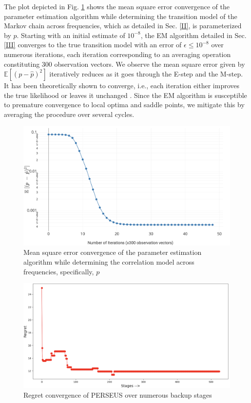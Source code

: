 \documentclass[10pt,twocolumn]{IEEEtran}
\begin{document}
The plot depicted in Fig. \ref{fig:4} shows the mean square error convergence of the parameter estimation algorithm while determining the transition model of the Markov chain across frequencies, which as detailed in Sec. \ref{II}, is parameterized by $p$. Starting with an initial estimate of $10^{-8}$, the EM algorithm detailed in Sec. \ref{III} converges to the true transition model with an error of $\epsilon{\leq}10^{-8}$ over numerous iterations, each iteration corresponding to an averaging operation constituting 300 observation vectors. We observe the mean square error given by $\mathbb{E}[(p{-}\hat{p})^{2}]$ iteratively reduces as it goes through the E-step and the M-step. It has been theoretically shown to converge, i.e., each iteration either improves the true likelihood or leaves it unchanged \cite{Neal1998}. Since the EM algorithm is susceptible to premature convergence to local optima and saddle points, we mitigate this by averaging the procedure over several cycles.
\begin{figure}
    \centering
    \includegraphics[width=1.0\linewidth]{ParameterEstimatorConvergence.png}
    \caption{Mean square error convergence of the parameter estimation algorithm while determining the correlation model across frequencies, specifically, $p$}
    \label{fig:4}
\end{figure}
\begin{figure}
    \centering
    \includegraphics[width=1.0\linewidth]{PerseusRegretConvergence.png}
    \caption{Regret convergence of PERSEUS over numerous backup stages}
    \vspace{-5mm}
    \label{fig:5}
\end{figure}
\end{document}
